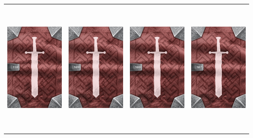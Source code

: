 \documentclass{minimal}
\begin{document}
{\begin{longtable}{llll}
\includegraphics[width=44mm,height=68mm]{./64-151/gh-110-helm-of-the-mountain-back.png} &
\includegraphics[width=44mm,height=68mm]{./64-151/gh-109-thiefs-hood-back.png} &
\includegraphics[width=44mm,height=68mm]{./64-151/gh-108-drakescale-helm-back.png} &
\includegraphics[width=44mm,height=68mm]{./64-151/gh-107-horned-helm-back.png}\\ 

\end{longtable}}
\end{document}
